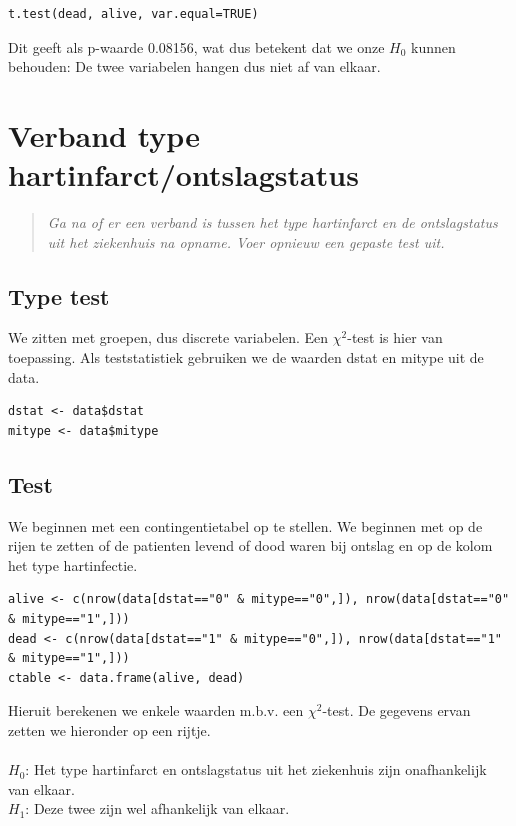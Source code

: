 \documentclass{article}
\begin{document}
\begin{verbatim}
t.test(dead, alive, var.equal=TRUE)
\end{verbatim}

Dit geeft als p-waarde 0.08156, wat dus betekent dat we onze $H_0$ kunnen behouden: De twee variabelen hangen dus niet af van elkaar. 

\section{Verband type hartinfarct/ontslagstatus}
\begin{quote}
\textit{
Ga na of er een verband is tussen het type hartinfarct en de ontslagstatus uit het ziekenhuis
na opname. Voer opnieuw een gepaste test uit.}
\end{quote}

\subsection{Type test}
We zitten met groepen, dus discrete variabelen. Een $\chi^2$-test is hier van toepassing. Als teststatistiek gebruiken we de waarden dstat en mitype uit de data. 

\begin{verbatim}
dstat <- data$dstat
mitype <- data$mitype
\end{verbatim}

\subsection{Test}
We beginnen met een contingentietabel op te stellen. We beginnen met op de rijen te zetten of de patienten levend of dood waren bij ontslag en op de kolom het type hartinfectie. 

\begin{verbatim}
alive <- c(nrow(data[dstat=="0" & mitype=="0",]), nrow(data[dstat=="0" & mitype=="1",]))
dead <- c(nrow(data[dstat=="1" & mitype=="0",]), nrow(data[dstat=="1" & mitype=="1",]))
ctable <- data.frame(alive, dead)
\end{verbatim}

Hieruit berekenen we enkele waarden m.b.v. een $\chi^2$-test. De gegevens ervan zetten we hieronder op een rijtje. \\ \\
$H_0$: Het type hartinfarct en ontslagstatus uit het ziekenhuis zijn onafhankelijk van elkaar.\\
$H_1$: Deze twee zijn wel afhankelijk van elkaar.
\end{document}
